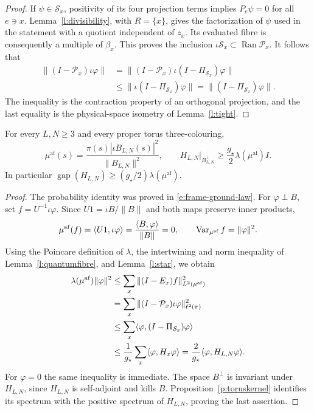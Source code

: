\begin{proof}
If \(\psi\in\mathcal S_x\), positivity of its four projection
terms implies \(P_e\psi=0\) for all \(e\ni x\).
Lemma~\ref{l:divisibility}, with \(R=\{x\}\), gives the
factorization of \(\psi\) used in the statement with a quotient
independent of \(z_x\). Its evaluated fibre is consequently a
multiple of \(\beta_x\). This proves the inclusion
\(\iota\mathcal S_x\subset\operatorname{Ran}\mathcal P_x\).
It follows that
\[
 \begin{split}
 \|(I-\mathcal P_x)\iota\varphi\|
 &=\|(I-\mathcal P_x)\iota(I-\Pi_{\mathcal S_x})\varphi\|\\
 &\le\|\iota(I-\Pi_{\mathcal S_x})\varphi\|
  =\|(I-\Pi_{\mathcal S_x})\varphi\|.
 \end{split}
\]
The inequality is the contraction property of an orthogonal
projection, and the last equality is the physical-space isometry
of Lemma~\ref{l:tight}.
\end{proof}

\begin{theorem}\label{t:QD}
For every \(L,N\ge3\) and every proper torus three-colouring,
\[
 \mu^{\mathrm{af}}(s)=
 \frac{\pi(s)|\iota B_{L,N}(s)|^2}{\|B_{L,N}\|^2},\qquad
 H_{L,N}\big|_{B_{L,N}^{\perp}}\ge
       \frac{g_\star}{2}\lambda(\mu^{\mathrm{af}})I .
\]
In particular
\(\operatorname{gap}(H_{L,N})\ge(g_\star/2)\lambda(\mu^{\mathrm{af}})\).
\end{theorem}

\begin{proof}
The probability identity was proved in
\eqref{e:frame-ground-law}. For \(\varphi\perp B\), set
\(f=U^{-1}\iota\varphi\). Since
\(U1=\iota B/\|B\|\) and both maps preserve inner products,
\[
 \mu^{\rm af}(f)
 =\langle U1,\iota\varphi\rangle
 =\frac{\langle B,\varphi\rangle}{\|B\|}=0,\qquad
 \operatorname{Var}_{\mu^{\rm af}}f=\|\varphi\|^2.
\]
Using the Poincare definition of \(\lambda\), the intertwining
and norm inequality of Lemma~\ref{l:quantumfibre}, and
Lemma~\ref{l:star}, we obtain
\[
 \begin{split}
 \lambda(\mu^{\rm af})\|\varphi\|^2
 &\le\sum_x\|(I-E_x)f\|_{L^2(\mu^{\rm af})}^2\\
 &=\sum_x\|(I-\mathcal P_x)\iota\varphi\|_{\ell^2(\pi)}^2\\
 &\le\sum_x\langle\varphi,(I-\Pi_{\mathcal S_x})\varphi\rangle\\
 &\le\frac1{g_\star}\sum_x\langle\varphi,H_x\varphi\rangle
  =\frac2{g_\star}\langle\varphi,H_{L,N}\varphi\rangle.
 \end{split}
\]
For \(\varphi=0\) the same inequality is immediate.
The space \(B^\perp\) is invariant under \(H_{L,N}\), since
\(H_{L,N}\) is self-adjoint and kills \(B\).
Proposition~\ref{p:toruskernel} identifies its spectrum with the
positive spectrum of \(H_{L,N}\), proving the last assertion.
\end{proof}

